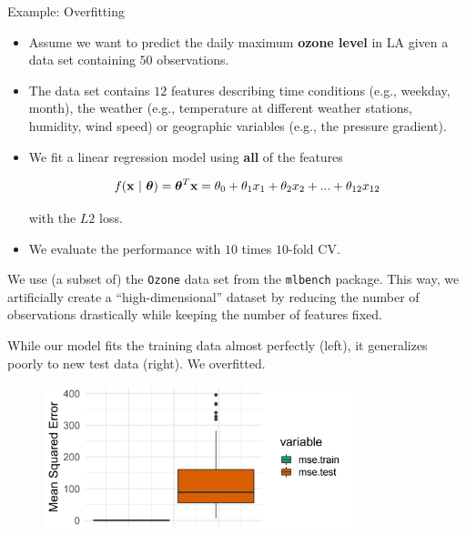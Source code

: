 \begin{vbframe}{Example: Overfitting}

\begin{itemize}
\item Assume we want to predict the daily maximum \textbf{ozone level} in LA given a data set containing $50$ observations.
\item The data set contains $12$ features describing time conditions (e.g., weekday, month),
the weather (e.g., temperature at different weather stations, humidity, wind speed) or geographic variables (e.g., the pressure gradient).
\item We fit a linear regression model using \textbf{all} of the features

$$
f(\mathbf{x} ~|~ \bm{\theta}) = \bm{\theta}^T\mathbf{x} = \theta_0 + \theta_1 x_1 + \theta_2 x_2 + ... + \theta_{12} x_{12}
$$

with the $L2$ loss.

\item We evaluate the performance with $10$ times $10$-fold CV.

\end{itemize}

\vfill

\begin{footnotesize}
We use (a subset of) the \texttt{Ozone} data set from the \texttt{mlbench} package. This way, we artificially create a \enquote{high-dimensional} dataset by reducing the number of observations drastically while keeping the number of features fixed.
\end{footnotesize}

\framebreak


While our model fits the training data almost perfectly (left), it generalizes poorly
to new test data (right). We overfitted.

\lz

\begin{figure}
\includegraphics[width=0.8\textwidth]{figure_man/example01.png}\\
\end{figure}

\end{vbframe}

